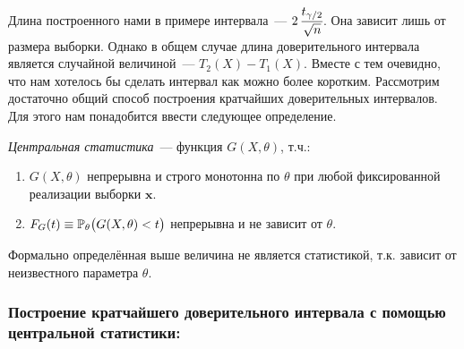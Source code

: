 Длина построенного нами в примере интервала~--- $2\, \cfrac{t_{\gamma / 2}}{\sqrt{n}}$.
Она зависит лишь от размера выборки.
Однако в общем случае длина доверительного интервала является случайной величиной~--- $T_2(X) - T_1(X)$.
Вместе с тем очевидно, что нам хотелось бы сделать интервал как можно более коротким.
Рассмотрим достаточно общий способ построения кратчайших доверительных интервалов.
Для этого нам понадобится ввести следующее определение.

\begin{defn}
    \textit{Центральная статистика}~--- функция $G(X,\theta)$, т.ч.:
    \begin{enumerate}
        \item $G(X,\theta)$ непрерывна и строго монотонна по $\theta$ при любой фиксированной реализации выборки $\boldsymbol{x}$. 
        \item $F_G (t) \equiv \operatorname{\operatorname{\mathbb{P}}_{\theta}} \bigl(G(X, \theta) < t\bigr)$ непрерывна и не зависит от $\theta$.
    \end{enumerate}
\end{defn}

\begin{rmrk}
    Формально определённая выше величина не является статистикой, т.к. зависит от неизвестного параметра $\theta$.
\end{rmrk}

\subsubsection{Построение кратчайшего доверительного интервала с помощью центральной статистики:}

